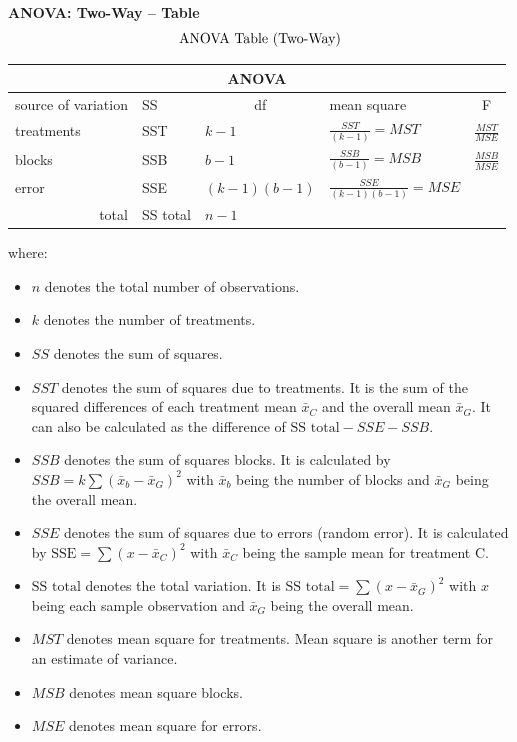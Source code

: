 \documentclass[	DIV=calc,%
							paper=a4,%
							fontsize=11pt,%
							twocolumn]{scrartcl} %
\newcommand{\formdesc}[1]{\noindent\textbf{#1}}
\begin{document}
\formdesc{ANOVA: Two-Way -- Table} \\
\begin{equation}
\label{anova table two-way}
\centering \text{ANOVA Table (Two-Way)}
\end{equation}
\begin{table}[!h] %
 \begin{footnotesize} %
 \begin{tabular}{@{}lllll@{}}
 \toprule
 \multicolumn{5}{c}{ANOVA} \\
 \midrule
 source of variation & \multicolumn{1}{l}{SS} & \multicolumn{1}{c}{df} & \multicolumn{1}{l}{mean square} & \multicolumn{1}{c}{F} \\
 \midrule
 treatments & SST & $k-1$ & $\frac{SST}{(k-1)}=MST$ & $\frac{MST}{MSE}$ \\
 blocks & SSB & $b-1$ & $\frac{SSB}{(b-1)}=MSB$ & $\frac{MSB}{MSE}$ \\
 error & SSE & $(k-1)(b-1)$ & $\frac{SSE}{(k-1)(b-1)} = MSE$ &  \\
 \multicolumn{1}{r}{total} & SS total  & $n - 1$ &  & 
 \end{tabular}
 \end{footnotesize}
\end{table}

where:
\begin{itemize}
 \item $n$ denotes the total number of observations.
 \item $k$ denotes the number of treatments.
 \item $SS$ denotes the sum of squares.
 \item $SST$ denotes the sum of squares due to treatments. It is the sum of the squared differences of each treatment mean $\bar{x}_C$ and the overall mean $\bar{x}_G$. It can also be calculated as the difference of $\text{SS total} - SSE - SSB$.
 \item $SSB$ denotes the sum of squares blocks. It is calculated by ${SSB} = k\sum(\bar{x}_{b}-\bar{x}_{G})^{2}$ with $\bar{x}_b$ being the number of blocks and $\bar{x}_G$ being the overall mean.
 \item $SSE$ denotes the sum of squares due to errors (random error). It is calculated by $\text{SSE} = \sum{(x-\bar{x}_C)^2}$ with $\bar{x}_C$ being the sample mean for treatment C.
 \item $\text{SS total}$ denotes the total variation. It is $\text{SS total} = \sum{(x-\bar{x}_{G})^{2}}$ with $x$ being each sample observation and $\bar{x}_G$ being the overall mean.
 \item $MST$ denotes mean square for treatments. Mean square is another term for an estimate of variance.
  \item $MSB$ denotes mean square blocks.
 \item $MSE$ denotes mean square for errors.
\end{itemize}
\end{document}
